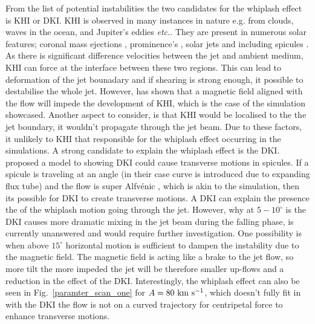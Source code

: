 \documentclass[12pt]{ociamthesis}
\newcommand{\Alfvenic}{Alfv\'{e}nic }
\newcommand{\kms}{~\rm{km ~s^{-1}}}
\newcommand{\np}{\\ \\}
\newcommand{\degs}{^{\circ}}
\begin{document}
From the list of potential instabilities the two candidates for the whiplash effect is KHI or DKI. KHI is observed in many instances in nature e.g. from clouds, waves in the ocean, and Jupiter's eddies \textit{etc.}.  They are present in numerous solar features; coronal mass ejections \citep{Foullon2011ApJ729L8F, Foullon2013ApJ767170F}, prominence's \citep{Berger2010ApJ7161288B, Ryutova2010SoPh26775R}, solar jets \citep{Filippov2015MNRAS4511117F,Li2018NatSR88136L}  and including spicules \citep{Kuridze2016ApJ830133K, Antolin2018ApJ85644A}. As there is significant difference velocities between the jet and ambient medium, KHI can force at the interface between these two regions. This can lead to deformation of the jet bounadary and if shearing is strong enough, it possible to destabilise the whole jet. However,  \cite{Chandrasekhar1961hhsbookC} has shown that a magnetic field aligned with the flow will impede the development of KHI, which is the case of the simulation showcased. Another aspect to consider, is that KHI would be localised to the the jet boundary, it wouldn't propagate through the jet beam. Due to these factors, it unlikely to KHI that responsible for the whiplash effect occurring in the simulations. A strong candidate to explain the whiplash effect is the DKI. \cite{Zaqarashvili2020ApJ893L46Z} proposed a model to showing DKI could cause transverse motions in spicules. If a spicule is traveling at an angle (in their case curve is introduced due to expanding flux tube) and the flow is super \Alfvenic, which is akin to the simulation, then its possible for DKI to create transverse motions. A DKI can explain the presence the of the whiplash motion going through the jet. However, why at $5-10\degs$ is the DKI causes more dramatic mixing in the jet beam during the falling phase, is currently unanswered and would require further investigation. One possibility is when above $15^{\circ}$ horizontal motion is sufficient to dampen the instability due to the magnetic field. The magnetic field is acting like a brake to the jet flow, so more tilt the more impeded the jet will be therefore smaller up-flows and a reduction in the effect of the DKI. Interestingly, the whiplash effect can also be seen in Fig.~\ref{paramter_scan_one} for $A=80 \kms$, which doesn't fully fit in with the DKI the flow is not on a curved trajectory for centripetal force to enhance transverse motions. \np
\end{document}
